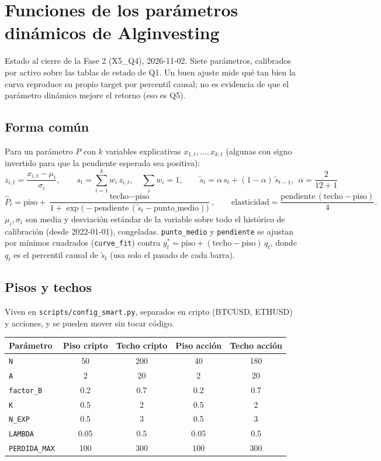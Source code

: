 \documentclass[11pt,a4paper]{article}
\newcommand{\code}[1]{\texttt{\small #1}}
\begin{document}
\pagestyle{plain}
\section*{Funciones de los parámetros dinámicos de Alginvesting}
{\color{cgris}\small Estado al cierre de la Fase 2 (X5\_Q4), 2026-11-02. Siete parámetros, calibrados por activo sobre las tablas de estado de Q1.
Un buen ajuste mide qué tan bien la curva reproduce su propio target por percentil causal; no es evidencia de que el parámetro dinámico mejore el retorno (eso es Q5).}

\subsection*{Forma común}
Para un parámetro $P$ con $k$ variables explicativas $x_{1,t},\dots,x_{k,t}$ (algunas con signo invertido para que la pendiente esperada sea positiva):
\[
z_{i,t}=\frac{x_{i,t}-\mu_i}{\sigma_i},\qquad
s_t=\sum_{i=1}^{k}w_i\,z_{i,t},\quad \sum_i w_i=1,\qquad
\tilde s_t=\alpha\,s_t+(1-\alpha)\,\tilde s_{t-1},\ \ \alpha=\frac{2}{12+1}
\]
\[
\hat P_t=\text{piso}+\frac{\text{techo}-\text{piso}}{1+\exp\!\big(-\text{pendiente}\,(\tilde s_t-\text{punto\_medio})\big)},
\qquad \text{elasticidad}=\frac{\text{pendiente}\,(\text{techo}-\text{piso})}{4}.
\]
$\mu_i,\sigma_i$ son media y desviación estándar de la variable sobre todo el histórico de calibración (desde 2022-01-01), congeladas. \code{punto\_medio} y \code{pendiente} se ajustan por mínimos cuadrados (\code{curve\_fit}) contra $y^*_t=\text{piso}+(\text{techo}-\text{piso})\,q_t$, donde $q_t$ es el percentil causal de $\tilde s_t$ (usa solo el pasado de cada barra).

\subsection*{Pisos y techos}
Viven en \code{scripts/config\_smart.py}, separados en cripto (BTCUSD, ETHUSD) y acciones, y se pueden mover sin tocar código.

\begin{center}\small
\begin{tabular}{lcccc}
\toprule
Parámetro & Piso cripto & Techo cripto & Piso acción & Techo acción \\
\midrule
\code{N} & 50 & 200 & 40 & 180 \\
\code{A} & 2 & 20 & 2 & 20 \\
\code{factor\_B} & 0.2 & 0.7 & 0.2 & 0.7 \\
\code{K} & 0.5 & 2 & 0.5 & 2 \\
\code{N\_EXP} & 0.5 & 3 & 0.5 & 3 \\
\code{LAMBDA} & 0.05 & 0.5 & 0.05 & 0.5 \\
\code{PERDIDA\_MAX} & 100 & 300 & 100 & 300 \\
\bottomrule
\end{tabular}
\end{center}
\newpage
\end{document}
